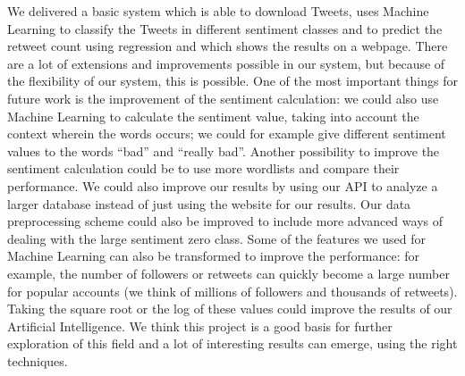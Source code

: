 \documentclass[10pt]{IEEEtran}
\begin{document}
We delivered a basic system which is able to download Tweets, uses Machine Learning to classify the Tweets in different sentiment classes and to predict the retweet count using regression and which shows the results on a webpage. There are a lot of extensions and improvements possible in our system, but because of the flexibility of our system, this is possible. One of the most important things for future work is the improvement of the sentiment calculation: we could also use Machine Learning to calculate the sentiment value, taking into account the context wherein the words occurs; we could for example give different sentiment values to the words ``bad'' and ``really bad''. Another possibility to improve the sentiment calculation could be to use more wordlists and compare their performance. We could also improve our results by using our API to analyze a larger database instead of just using the website for our results. Our data preprocessing scheme could also be improved to include more advanced ways of dealing with the large sentiment zero class. Some of the features we used for Machine Learning can also be transformed to improve the performance: for example, the number of followers or retweets can quickly become a large number for popular accounts (we think of millions of followers and thousands of retweets). Taking the square root or the log of these values could improve the results of our Artificial Intelligence. We think this project is a good basis for further exploration of this field and a lot of interesting results can emerge, using the right techniques. 




\clearpage
\end{document}
